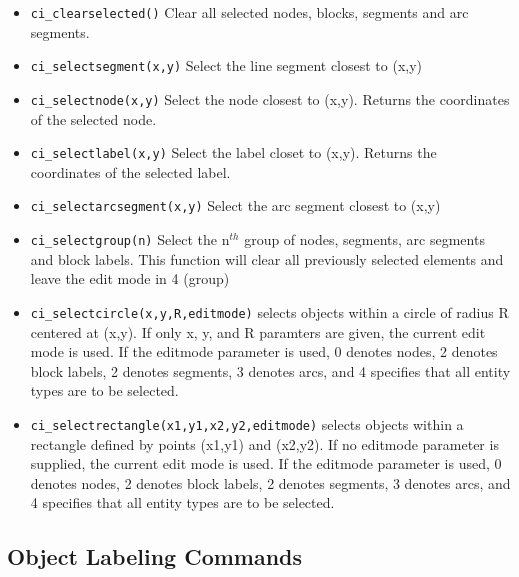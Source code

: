 \begin{itemize}
\item {\tt ci\_clearselected()} Clear all selected nodes, blocks, segments and arc
segments.

\item {\tt ci\_selectsegment(x,y)} Select the line segment closest to (x,y)

\item {\tt ci\_selectnode(x,y)} Select the node closest to (x,y).
Returns the coordinates of the selected node.

\item {\tt ci\_selectlabel(x,y)} Select the label closet to (x,y).
Returns the coordinates of the selected label.

\item {\tt ci\_selectarcsegment(x,y)} Select the arc segment closest to (x,y)

\item {\tt ci\_selectgroup(n)} Select the n$^{th}$ group of nodes, segments, arc
segments and block labels. This function will clear all previously selected
elements and leave the edit mode in 4 (group)

\item{\tt ci\_selectcircle(x,y,R,editmode)} selects objects within a circle of radius
R centered at (x,y).  If only x, y, and R paramters are given, the current
edit mode is used.  If the editmode parameter is used, 0 denotes nodes, 2
denotes block labels, 2 denotes segments, 3 denotes arcs, and 4 specifies
that all entity types are to be selected.

\item{\tt ci\_selectrectangle(x1,y1,x2,y2,editmode)} selects objects within a rectangle
defined by points (x1,y1) and (x2,y2). If no editmode parameter is supplied,
the current edit mode is used.  If the editmode parameter is used, 0 denotes
nodes, 2 denotes block labels, 2 denotes segments, 3 denotes arcs, and 4
specifies that all entity types are to be selected.

\end{itemize}


\subsection{Object Labeling Commands}

